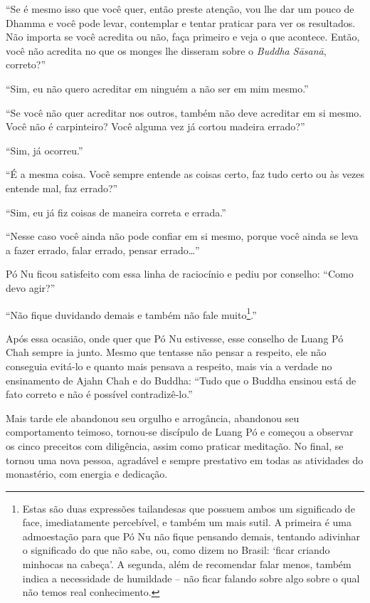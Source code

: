 ``Se é mesmo isso que você quer, então preste atenção, vou lhe dar um
pouco de Dhamma e você pode levar, contemplar e tentar praticar para ver
os resultados. Não importa se você acredita ou não, faça primeiro e veja
o que acontece. Então, você não acredita no que os monges lhe disseram
sobre o \emph{Buddha Sāsanā}, correto?''

``Sim, eu não quero acreditar em ninguém a não ser em mim mesmo.''

``Se você não quer acreditar nos outros, também não deve acreditar em si
mesmo. Você não é carpinteiro? Você alguma vez já cortou madeira
errado?''

``Sim, já ocorreu.''

``É a mesma coisa. Você sempre entende as coisas certo, faz tudo certo
ou às vezes entende mal, faz errado?''

``Sim, eu já fiz coisas de maneira correta e errada.''

``Nesse caso você ainda não pode confiar em si mesmo, porque você ainda
se leva a fazer errado, falar errado, pensar errado\ldots{}''

Pó Nu ficou satisfeito com essa linha de raciocínio e pediu por
conselho: ``Como devo agir?''

``Não fique duvidando demais e também não fale muito\footnote{Estas são
  duas expressões tailandesas que possuem ambos um significado de face,
  imediatamente percebível, e também um mais sutil. A primeira é uma
  admoestação para que Pó Nu não fique pensando demais, tentando
  adivinhar o significado do que não sabe, ou, como dizem no Brasil:
  `ficar criando minhocas na cabeça'. A segunda, além de recomendar
  falar menos, também indica a necessidade de humildade -- não ficar
  falando sobre algo sobre o qual não temos real conhecimento.}.''

Após essa ocasião, onde quer que Pó Nu estivesse, esse conselho de Luang
Pó Chah sempre ia junto. Mesmo que tentasse não pensar a respeito, ele
não conseguia evitá-lo e quanto mais pensava a respeito, mais via a
verdade no ensinamento de Ajahn Chah e do Buddha: ``Tudo que o Buddha
ensinou está de fato correto e não é possível contradizê-lo.''

Mais tarde ele abandonou seu orgulho e arrogância, abandonou seu
comportamento teimoso, tornou-se discípulo de Luang Pó e começou a
observar os cinco preceitos com diligência, assim como praticar
meditação. No final, se tornou uma nova pessoa, agradável e sempre
prestativo em todas as atividades do monastério, com energia e
dedicação.

